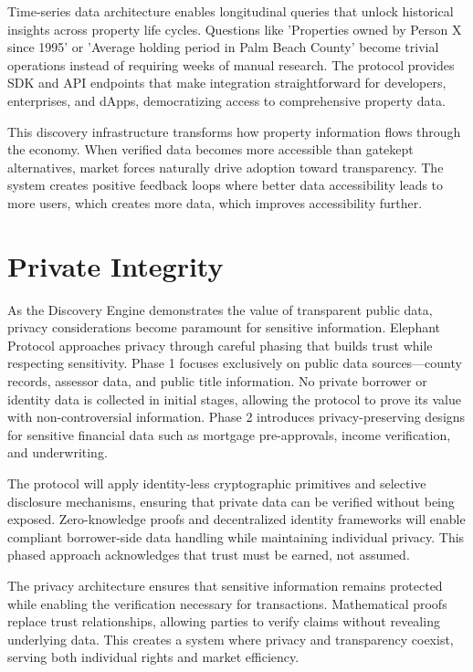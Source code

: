 Time-series data architecture enables longitudinal queries that unlock historical insights across property life cycles. Questions like 'Properties owned by Person X since 1995' or 'Average holding period in Palm Beach County' become trivial operations instead of requiring weeks of manual research. The protocol provides SDK and API endpoints that make integration straightforward for developers, enterprises, and dApps, democratizing access to comprehensive property data.

This discovery infrastructure transforms how property information flows through the economy. When verified data becomes more accessible than gatekept alternatives, market forces naturally drive adoption toward transparency. The system creates positive feedback loops where better data accessibility leads to more users, which creates more data, which improves accessibility further.

\section{Private Integrity}

As the Discovery Engine demonstrates the value of transparent public data, privacy considerations become paramount for sensitive information. Elephant Protocol approaches privacy through careful phasing that builds trust while respecting sensitivity. Phase 1 focuses exclusively on public data sources---county records, assessor data, and public title information. No private borrower or identity data is collected in initial stages, allowing the protocol to prove its value with non-controversial information. Phase 2 introduces privacy-preserving designs for sensitive financial data such as mortgage pre-approvals, income verification, and underwriting.

The protocol will apply identity-less cryptographic primitives and selective disclosure mechanisms, ensuring that private data can be verified without being exposed. Zero-knowledge proofs and decentralized identity frameworks will enable compliant borrower-side data handling while maintaining individual privacy. This phased approach acknowledges that trust must be earned, not assumed.

The privacy architecture ensures that sensitive information remains protected while enabling the verification necessary for transactions. Mathematical proofs replace trust relationships, allowing parties to verify claims without revealing underlying data. This creates a system where privacy and transparency coexist, serving both individual rights and market efficiency.

